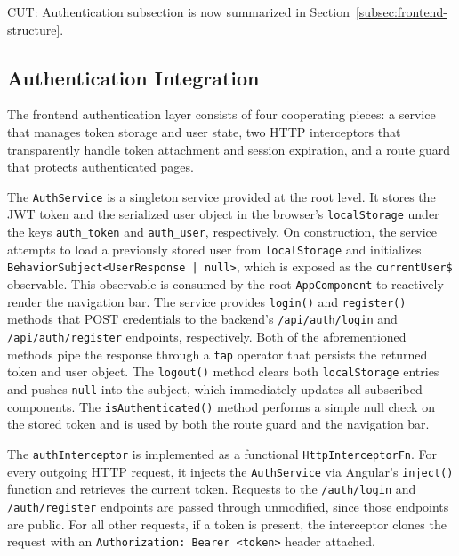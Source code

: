 \iffalse
CUT: Authentication subsection is now summarized in Section~\ref{subsec:frontend-structure}.

\subsection{Authentication Integration}
\label{subsec:frontend-auth}

 \par The frontend authentication layer consists of four cooperating pieces: a service that manages token storage and user state, two HTTP interceptors that transparently handle token attachment and session expiration, and a route guard that protects authenticated pages.

The \texttt{AuthService} is a singleton service provided at the root level. It stores the JWT token and the serialized user object in the browser's \texttt{localStorage} under the keys \texttt{auth\_token} and \texttt{auth\_user}, respectively. On construction, the service attempts to load a previously stored user from \texttt{localStorage} and initializes \texttt{BehaviorSubject<UserResponse | null>}, which is exposed as the \texttt{cur\-rentUser\$} observable. This observable is consumed by the root \texttt{AppComponent} to reactively render the navigation bar. The service provides \texttt{login()} and \texttt{re\-gis\-ter()} methods that POST credentials to the backend's \texttt{/api/auth/login} and \texttt{/api/\-auth/\-re\-gis\-ter} endpoints, respectively. Both of the aforementioned methods pipe the response through a \texttt{tap} operator that persists the returned token and user object. The \texttt{logout()} method clears both \texttt{localStorage} entries and pushes \texttt{null} into the subject, which immediately updates all subscribed components. The \texttt{is\-Au\-then\-ti\-cated()} method performs a simple null check on the stored token and is used by both the route guard and the navigation bar.

The \texttt{authInterceptor} is implemented as a functional \texttt{HttpInterceptorFn}. For every outgoing HTTP request, it injects the \texttt{AuthService} via Angular's \texttt{in\-ject()} function and retrieves the current token. Requests to the \texttt{/auth/login} and \texttt{/auth/re\-gis\-ter} endpoints are passed through unmodified, since those endpoints are public. For all other requests, if a token is present, the interceptor clones the request with an \texttt{Authorization: Bearer <token>} header attached.

